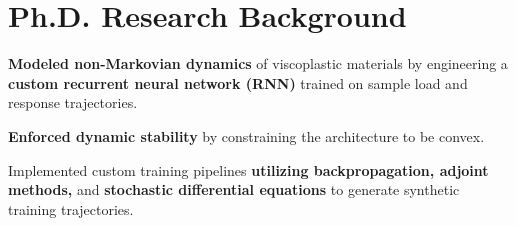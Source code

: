 \section{\sc Ph.D. Research Background}
\begin{list1}
    \item \textbf{Modeled non-Markovian dynamics} of viscoplastic materials by engineering a \textbf{custom recurrent neural network (RNN)} trained on sample load and response trajectories.

\item \textbf{Enforced dynamic stability} by constraining the architecture to be convex.

\item Implemented custom training pipelines \textbf{utilizing backpropagation, adjoint methods, } and \textbf{stochastic differential equations} to generate synthetic training trajectories.

\end{list1}

\endinput